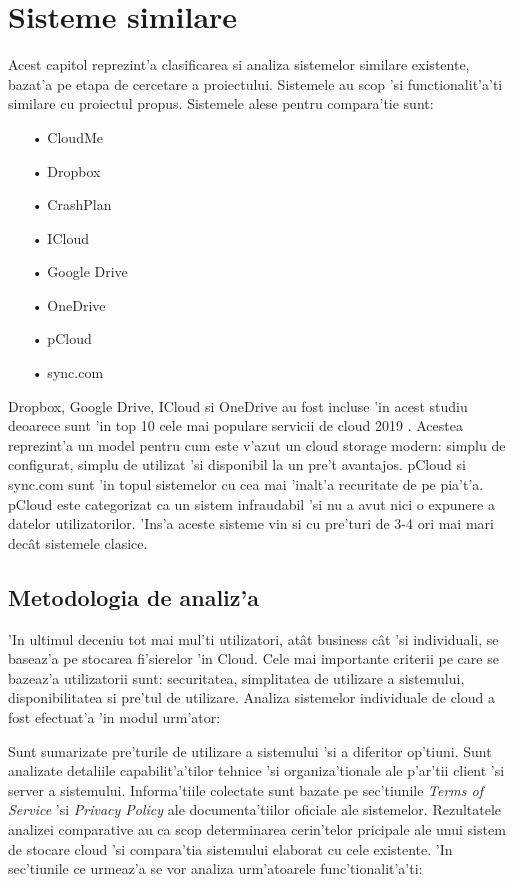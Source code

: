 \documentclass[12pt,a4paper,twoside]{report}
\begin{document}
\section{Sisteme similare}\label{sisteme_similare}
Acest capitol reprezint'a clasificarea si analiza sistemelor similare existente, bazat'a pe etapa de cercetare a proiectului. Sistemele au scop 'si functionalit'a'ti similare cu proiectul propus. Sistemele alese pentru compara'tie sunt:
\begin{itemize}
\item[•] CloudMe
\item[•] Dropbox
\item[•] CrashPlan
\item[•] ICloud
\item[•] Google Drive
\item[•] OneDrive
\item[•] pCloud
\item[•] sync.com
\end{itemize}
Dropbox, Google Drive, ICloud si OneDrive au fost incluse 'in acest studiu deoarece sunt 'in top 10 cele mai populare servicii de cloud 2019 \cite{topcloud}. Acestea reprezint'a un model pentru cum este v'azut un cloud storage modern: simplu de configurat, simplu de utilizat 'si disponibil la un pre't avantajos.
pCloud si sync.com sunt 'in topul sistemelor cu cea mai 'inalt'a recuritate de pe pia't'a. pCloud este categorizat ca un sistem infraudabil 'si nu a avut nici o expunere a datelor utilizatorilor. 'Ins'a aceste sisteme vin si cu pre'turi de 3-4 ori mai mari decât sistemele clasice.
\subsection{Metodologia de analiz'a}
'In ultimul deceniu tot mai mul'ti utilizatori, atât business cât 'si individuali, se baseaz'a pe stocarea fi'sierelor 'in Cloud.  Cele mai importante criterii pe care se bazeaz'a utilizatorii sunt: securitatea, simplitatea de utilizare a sistemului, disponibilitatea si pre'tul de utilizare. Analiza sistemelor individuale de cloud a fost efectuat'a 'in modul urm'ator:

Sunt sumarizate pre'turile de utilizare a sistemului 'si a diferitor op'tiuni. Sunt analizate detaliile capabilit'a'tilor tehnice 'si organiza'tionale ale p'ar'tii client 'si server a sistemului. Informa'tiile colectate sunt bazate pe sec'tiunile
{\it Terms of Service } 'si {\it Privacy Policy} ale documenta'tiilor oficiale ale sistemelor\cite{cloudstoragecomparison}.
Rezultatele analizei comparative au ca scop determinarea cerin'telor pricipale ale unui sistem de stocare cloud 'si compara'tia sistemului elaborat cu cele existente.
'In sec'tiunile ce urmeaz'a se vor analiza urm'atoarele func'tionalit'a'ti:
\end{document}
